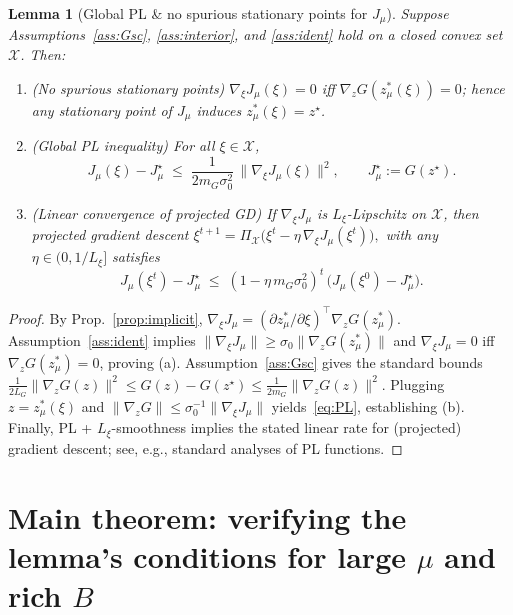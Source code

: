 \documentclass[11pt]{article}
\newtheorem{lemma}{Lemma}
\theoremstyle{remark}
\begin{document}
\begin{lemma}[Global PL \& no spurious stationary points for $J_\mu$]
\label{lem:PL}
Suppose Assumptions~\ref{ass:Gsc}, \ref{ass:interior}, and \ref{ass:ident} hold on a closed convex set $\mathcal{X}$. Then:
\begin{enumerate}[leftmargin=2em,label=(\alph*)]
\item (No spurious stationary points)
$\nabla_\xi J_\mu(\xi)=0$ iff $\nabla_z G(z^*_\mu(\xi))=0$; hence any stationary point of $J_\mu$ induces $z^*_\mu(\xi)=z^\star$.
\item (Global PL inequality)
For all $\xi\in\mathcal{X}$,
\begin{equation}
\label{eq:PL}
J_\mu(\xi)-J_\mu^\star \;\le\; \frac{1}{2 m_G \sigma_0^2}\,\big\|\nabla_\xi J_\mu(\xi)\big\|^2,
\qquad
J_\mu^\star:=G(z^\star).
\end{equation}
\item (Linear convergence of projected GD)
If $\nabla_\xi J_\mu$ is $L_\xi$-Lipschitz on $\mathcal{X}$, then projected gradient descent
\(
\xi^{t+1}=\Pi_{\mathcal{X}}\big(\xi^t-\eta\,\nabla_\xi J_\mu(\xi^t)\big),
\)
with any $\eta\in(0,1/L_\xi]$ satisfies
\[
J_\mu(\xi^{t})-J_\mu^\star \;\le\; (1-\eta\,m_G\sigma_0^2)^t\,\big(J_\mu(\xi^{0})-J_\mu^\star\big).
\]
\end{enumerate}
\end{lemma}

\begin{proof}
By Prop.~\ref{prop:implicit}, $\nabla_\xi J_\mu=(\partial z^*_\mu/\partial \xi)^\top \nabla_z G(z^*_\mu)$. Assumption~\ref{ass:ident} implies
$\|\nabla_\xi J_\mu\| \ge \sigma_0 \|\nabla_z G(z^*_\mu)\|$ and
$\nabla_\xi J_\mu=0$ iff $\nabla_z G(z^*_\mu)=0$, proving (a).
Assumption~\ref{ass:Gsc} gives the standard bounds
\(
\frac{1}{2L_G}\|\nabla_z G(z)\|^2 \le G(z)-G(z^\star) \le \frac{1}{2m_G}\|\nabla_z G(z)\|^2 .
\)
Plugging $z=z^*_\mu(\xi)$ and $\|\nabla_z G\|\le \sigma_0^{-1}\|\nabla_\xi J_\mu\|$ yields~\eqref{eq:PL}, establishing (b).
Finally, PL + $L_\xi$-smoothness implies the stated linear rate for (projected) gradient descent; see, e.g., standard analyses of PL functions.
\end{proof}

\section{Main theorem: verifying the lemma's conditions for large $\mu$ and rich $B$}
\end{document}
